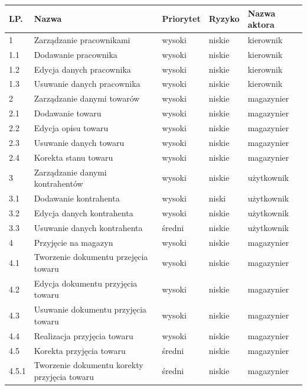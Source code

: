 \begin{table}[ht]
	 \begin{center}
	    \begin{tabular}{| l | l | l | l | l |}%
	    	\hline
		    \textbf{LP.} & \textbf{Nazwa}  & \textbf{Priorytet} & \textbf{Ryzyko} &
		    \textbf{Nazwa aktora} \\
		    \hline
			1 & Zarządzanie pracownikami & wysoki & niskie & kierownik \\
		    1.1 & Dodawanie pracownika & wysoki & niskie & kierownik \\
		    1.2 & Edycja danych pracownika & wysoki & niskie & kierownik \\ 	
		    1.3 & Usuwanie danych pracownika & wysoki &niskie & kierownik \\
		    \hline
		    2 & Zarządzanie danymi towarów & wysoki & niskie & magazynier \\
		    2.1 & Dodawanie towaru & wysoki &  niskie & magazynier \\
		    2.2 & Edycja opisu towaru & wysoki & niskie & magazynier \\
		    2.3 & Usuwanie danych towaru & wysoki & niskie & magazynier \\
            2.4 & Korekta stanu towaru & wysoki & niskie & magazynier \\
		    \hline
		   	3 & Zarządzanie danymi kontrahentów & wysoki & niskie & użytkownik \\
		   	3.1 & Dodawanie kontrahenta & wysoki & niski & użytkownik \\
		   	3.2 & Edycja danych kontrahenta & wysoki & niskie & użytkownik \\
		   	3.3 & Usuwanie danych kontrahenta & średni & niskie & użytkownik \\
		   	\hline
            4 & Przyjęcie na magazyn & wysoki & niskie & magazynier \\
		   	4.1 & Tworzenie dokumentu przejęcia towaru & wysoki & niskie & magazynier \\
		   	4.2 & Edycja dokumentu przyjęcia towaru & wysoki & niskie & magazynier \\
		   	4.3 & Usuwanie dokumentu przyjęcia towaru & wysoki & niskie & magazynier \\
		   	4.4 & Realizacja przyjęcia towaru & wysoki & niskie & magazynier \\
		   	4.5 & Korekta przyjęcia towaru & średni & niskie & magazynier \\
            4.5.1 & Tworzenie dokumentu korekty przyjęcia towaru & średni & niskie & magazynier \\

\end{tabular}
\end{center}
\end{table}
